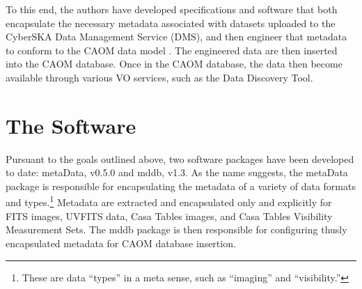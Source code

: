 To this end, the authors have developed  specifications and software that both encapsulate the necessary metadata associated with datasets uploaded to the  CyberSKA Data Management Service (DMS), and then engineer that metadata to conform to the CAOM data model \citep{dowler_2007}. The engineered data are then inserted into the CAOM database. Once in the CAOM database, the data then become available through various VO services, such as the Data Discovery Tool. 

\section{The Software}
Pursuant to the goals outlined above, two software packages have been developed to date: metaData, v0.5.0 and mddb, v1.3. As the name suggests, the metaData package is responsible for encapsulating the metadata of a variety of data formats and types.\footnote{These are data ``types'' in a meta sense, such as ``imaging'' and ``visibility.''} Metadata are extracted and encapsulated only and explicitly for FITS images, UVFITS data, Casa Tables images, and Casa Tables Visibility Measurement Sets. The mddb package is then responsible for configuring thusly encapsulated metadata for CAOM database insertion.

